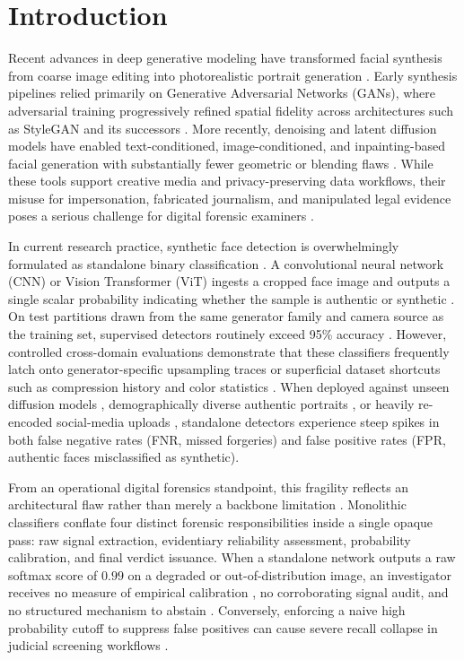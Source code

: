 \documentclass[final,5p,times,twocolumn,numafflabel]{elsarticle}
\begin{document}
\section{Introduction}

Recent advances in deep generative modeling have transformed facial synthesis from coarse image editing into photorealistic portrait generation \cite{Croitoru_2026}. Early synthesis pipelines relied primarily on Generative Adversarial Networks (GANs), where adversarial training progressively refined spatial fidelity across architectures such as StyleGAN and its successors \cite{Melnik_2024}. More recently, denoising and latent diffusion models have enabled text-conditioned, image-conditioned, and inpainting-based facial generation with substantially fewer geometric or blending flaws \cite{Cheng_2024}. While these tools support creative media and privacy-preserving data workflows, their misuse for impersonation, fabricated journalism, and manipulated legal evidence poses a serious challenge for digital forensic examiners \cite{Hydara_2024}.

In current research practice, synthetic face detection is overwhelmingly formulated as standalone binary classification \cite{Heidari_2023}. A convolutional neural network (CNN) or Vision Transformer (ViT) ingests a cropped face image and outputs a single scalar probability indicating whether the sample is authentic or synthetic \cite{Malik_2022}. On test partitions drawn from the same generator family and camera source as the training set, supervised detectors routinely exceed 95\% accuracy \cite{Khan_2024}. However, controlled cross-domain evaluations demonstrate that these classifiers frequently latch onto generator-specific upsampling traces \cite{Guarnera_2020} or superficial dataset shortcuts such as compression history and color statistics \cite{Altamimi_2026}. When deployed against unseen diffusion models \cite{Cheng_2024}, demographically diverse authentic portraits \cite{Xu_2024}, or heavily re-encoded social-media uploads \cite{Guo_2024}, standalone detectors experience steep spikes in both false negative rates (FNR, missed forgeries) and false positive rates (FPR, authentic faces misclassified as synthetic).

From an operational digital forensics standpoint, this fragility reflects an architectural flaw rather than merely a backbone limitation \cite{Silva_2022}. Monolithic classifiers conflate four distinct forensic responsibilities inside a single opaque pass: raw signal extraction, evidentiary reliability assessment, probability calibration, and final verdict issuance. When a standalone network outputs a raw softmax score of $0.99$ on a degraded or out-of-distribution image, an investigator receives no measure of empirical calibration \cite{Jin_2025}, no corroborating signal audit, and no structured mechanism to abstain \cite{Maiano_2026}. Conversely, enforcing a naive high probability cutoff to suppress false positives can cause severe recall collapse in judicial screening workflows \cite{Hydara_2024}.
\end{document}
